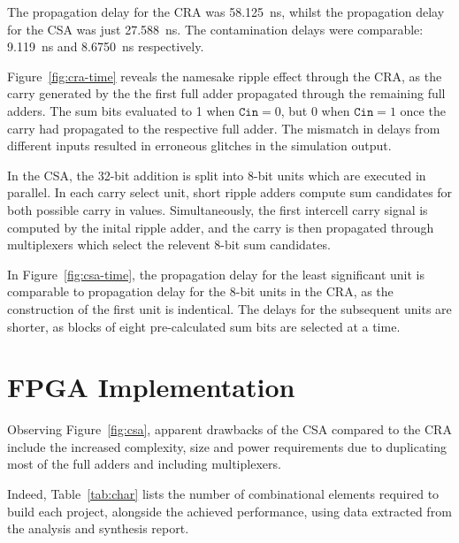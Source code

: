 \documentclass[a4paper,11pt]{article}
\begin{document}
The propagation delay for the CRA was \SI{58.125}{\ns}, whilst the propagation delay for the CSA was just \SI{27.588}{\ns}. The contamination delays were comparable: \SI{9.119}{\ns} and \SI{8.6750}{\ns} respectively.

Figure~\ref{fig:cra-time} reveals the namesake ripple effect through the CRA, as the carry generated by the the first full adder propagated through the remaining full adders. The sum bits evaluated to 1 when $\mathtt{Cin}=0$, but 0 when $\mathtt{Cin}=1$ once the carry had propagated to the respective full adder. The mismatch in delays from different inputs resulted in erroneous glitches in the simulation output.

In the CSA, the 32-bit addition is split into 8-bit units which are executed in parallel. In each carry select unit, short ripple adders compute sum candidates for both possible carry in values. Simultaneously, the first intercell carry signal is computed by the inital ripple adder, and the carry is then propagated through multiplexers which select the relevent 8-bit sum candidates.

In Figure~\ref{fig:csa-time}, the propagation delay for the least significant unit is comparable to propagation delay for the 8-bit units in the CRA, as the construction of the first unit is indentical. The delays for the subsequent units are shorter, as blocks of eight pre-calculated sum bits are selected at a time.

\section{FPGA Implementation}

Observing Figure~\ref{fig:csa}, apparent drawbacks of the CSA compared to the CRA include the increased complexity, size and power requirements due to duplicating most of the full adders and including multiplexers.

Indeed, Table~\ref{tab:char} lists the number of combinational elements required to build each project, alongside the achieved performance, using data extracted from the analysis and synthesis report.
\end{document}
